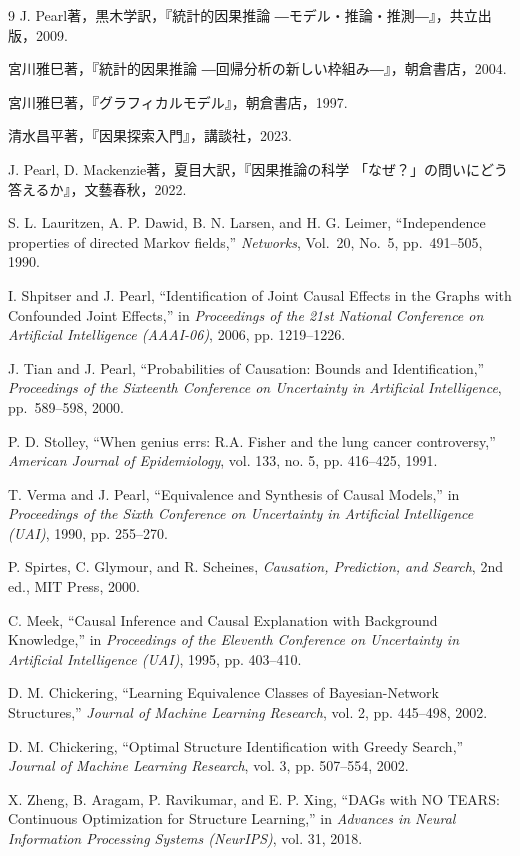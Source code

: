 \documentclass[uplatex, dvipdfmx]{jsarticle}
\begin{document}
\newpage
\begin{thebibliography}{9}
  J. Pearl著，黒木学訳，『統計的因果推論 ―モデル・推論・推測―』，共立出版，2009.

  宮川雅巳著，『統計的因果推論 ―回帰分析の新しい枠組み―』，朝倉書店，2004.

  宮川雅巳著，『グラフィカルモデル』，朝倉書店，1997.

  清水昌平著，『因果探索入門』，講談社，2023.

  J. Pearl, D. Mackenzie著，夏目大訳，『因果推論の科学 「なぜ？」の問いにどう答えるか』，文藝春秋，2022.

  S. L. Lauritzen, A. P. Dawid, B. N. Larsen, and H. G. Leimer, ``Independence properties of directed Markov fields,'' \textit{Networks}, Vol.~20, No.~5, pp.~491--505, 1990.

  I. Shpitser and J. Pearl, ``Identification of Joint Causal Effects in the Graphs with Confounded Joint Effects,'' in \textit{Proceedings of the 21st National Conference on Artificial Intelligence (AAAI-06)}, 2006, pp. 1219--1226.

  J. Tian and J. Pearl, ``Probabilities of Causation: Bounds and Identification,'' \textit{Proceedings of the Sixteenth Conference on Uncertainty in Artificial Intelligence}, pp.~589--598, 2000.

  P. D. Stolley, ``When genius errs: R.A. Fisher and the lung cancer controversy,'' \textit{American Journal of Epidemiology}, vol. 133, no. 5, pp. 416--425, 1991.

  T. Verma and J. Pearl,
  ``Equivalence and Synthesis of Causal Models,''
  in \textit{Proceedings of the Sixth Conference on Uncertainty in Artificial Intelligence (UAI)}, 1990, pp. 255--270.

  P. Spirtes, C. Glymour, and R. Scheines,
  \textit{Causation, Prediction, and Search},
  2nd ed.,
  MIT Press, 2000.

  C. Meek,
  ``Causal Inference and Causal Explanation with Background Knowledge,''
  in \textit{Proceedings of the Eleventh Conference on Uncertainty in Artificial Intelligence (UAI)}, 1995, pp. 403--410.

  D. M. Chickering,
  ``Learning Equivalence Classes of Bayesian-Network Structures,''
  \textit{Journal of Machine Learning Research},
  vol. 2,
  pp. 445--498,
  2002.

  D. M. Chickering,
  ``Optimal Structure Identification with Greedy Search,''
  \textit{Journal of Machine Learning Research},
  vol. 3, pp. 507--554, 2002.

  
  X. Zheng, B. Aragam, P. Ravikumar, and E. P. Xing,
  ``DAGs with NO TEARS: Continuous Optimization for Structure Learning,''
  in \textit{Advances in Neural Information Processing Systems (NeurIPS)}, vol. 31, 2018.

\end{thebibliography}
\end{document}
